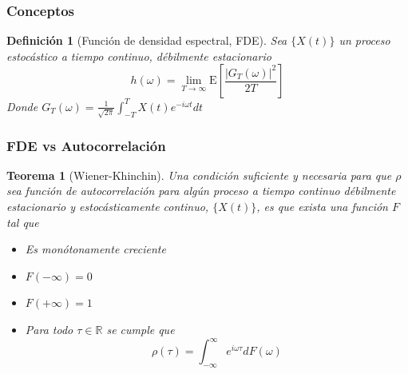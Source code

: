 \documentclass[serif,mathserif,professionalfont]{beamer}
\newtheorem{definicion}{Definición}
\newtheorem{teorema}{Teorema}
\newcommand{\R}{\mathbb{R}}
\newcommand{\intR}{\int_{-\infty}^{\infty}}
\newcommand{\E}[1]{\mathrm{E}\left[ #1 \right]}
\begin{document}
\begin{frame}\frametitle{Conceptos}

\begin{definicion}[Funci\'on de densidad espectral, FDE]
Sea $\{X(t)\}$ un proceso estoc\'astico a tiempo continuo, d\'ebilmente estacionario
\begin{equation*}
h(\omega) = \lim_{T\rightarrow \infty} \E{ \frac{ \left| G_T(\omega) \right|^{2}}{2 T} }
\end{equation*}
Donde $\displaystyle G_T (\omega) = \frac{1}{\sqrt{2 \pi}} \int_{-T}^{T} X(t) e^{-i \omega t} dt$
\end{definicion}
\end{frame}


\begin{frame}\frametitle{FDE vs Autocorrelación}
\begin{teorema}[Wiener-Khinchin]
Una condici\'on suficiente y necesaria para que $\rho$ sea funci\'on de autocorrelaci\'on para 
alg\'un proceso a tiempo continuo d\'ebilmente estacionario y estoc\'asticamente continuo, 
$\{X(t)\}$,  es que exista una funci\'on $F$ tal que
\begin{itemize}
\item Es mon\'otonamente creciente
\item $F(-\infty) = 0$
\item $F(+\infty) = 1$
\item Para todo $\tau \in \R$ se cumple que
\begin{equation*}
\rho(\tau) = \intR e^{i \omega \tau} dF(\omega)
\end{equation*}
\end{itemize}
\end{teorema}
\end{frame}

\end{document}
